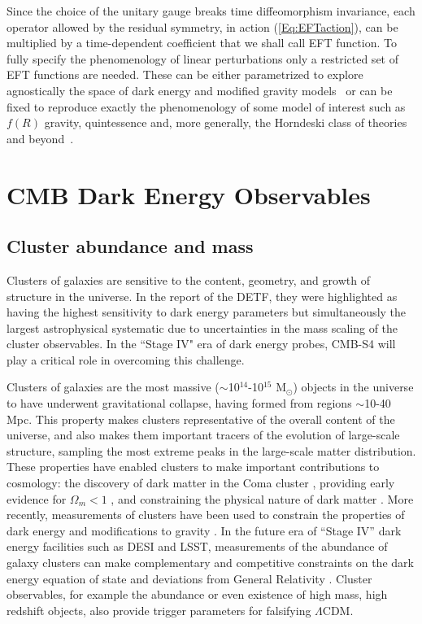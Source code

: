 Since the choice of the unitary gauge breaks time diffeomorphism invariance, each operator allowed by the residual symmetry, in action (\ref{Eq:EFTaction}), can be multiplied by a time-dependent coefficient that we shall call EFT function. To fully specify the phenomenology of linear perturbations only a restricted set of EFT functions are needed. These can be either parametrized to explore agnostically the space of dark energy and modified gravity models~\cite{Gleyzes:2013ooa,Bloomfield:2013efa,Piazza:2013coa,Gleyzes:2014rba} or can be fixed to reproduce exactly the phenomenology of some model of interest such as $f(R)$ gravity, quintessence and, more generally, the Horndeski class of theories and beyond~\cite{Gleyzes:2014dya,Frusciante:2015maa,Frusciante:2016xoj}.
%


\section{CMB  Dark Energy Observables}
\label{sec:deobs}

\subsection{Cluster abundance and mass}

Clusters of galaxies are sensitive to the content, geometry, and growth of structure in the universe.     In the report of the DETF, they were highlighted as having the highest sensitivity
to dark energy parameters  but simultaneously the largest astrophysical systematic due
to uncertainties in the mass scaling of the cluster observables.   In the ``Stage IV" era of
dark energy probes, CMB-S4 will play a critical role in overcoming this challenge.




Clusters of galaxies are the most massive ($\sim$10$^{14}$-10$^{15}$ M$_{\odot}$) objects in the universe to have underwent gravitational collapse, 
having formed from regions $\sim$10-40 Mpc.  This property makes clusters representative of the overall content of the universe, and also makes them 
important tracers of the evolution of large-scale structure, sampling the most extreme peaks in the large-scale matter distribution.  
These properties have enabled clusters to make important contributions to cosmology: the discovery of dark matter in the 
Coma cluster \cite{Zwicky:1933gu}, 
providing early evidence for $\Omega_m < 1$ \cite{White:1993wm, Donahue:1997sp, Bahcall:1998ur}, and
constraining the physical nature of dark matter \cite{Clowe:2006eq}.  
More recently, measurements of clusters have been used to constrain the properties of dark energy and modifications 
to gravity \cite{Vikhlinin:2008ym, Mantz:2009fw, Rapetti:2012bu, Benson:2011uta, Mantz:2014xba, Mantz:2014paa}.   In the future era of ``Stage IV'' dark energy 
facilities such as DESI and LSST, measurements of the abundance of galaxy clusters can make complementary and 
competitive constraints on the dark energy equation of state and deviations from General Relativity \cite{Weinberg:2012es}.   Cluster observables, for example the abundance or even existence of high mass, high redshift objects, also provide trigger parameters for falsifying $\Lambda$CDM.

